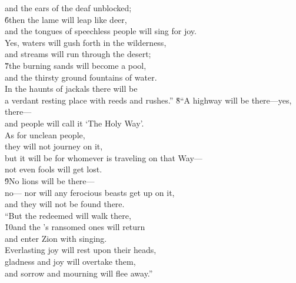 \begin{poetry}
\poemll    and the ears of the deaf unblocked; \\
\poeml \v{6}then the lame will leap like deer, \\
\poemll    and the tongues of speechless people will sing for joy. \\
\poeml Yes, waters will gush forth in the wilderness, \\
\poemll    and streams will run through the desert; \\
\poeml \v{7}the burning sands will become a pool, \\
\poemll    and the thirsty ground fountains of water. \\
\poeml In the haunts of jackals there will be \\
\poemll    a verdant resting place with reeds and rushes.''
\poeml \v{8}``A highway will be there---yes, there--- \\
\poemll    and people will call it `The Holy Way'. \\
\poeml As for unclean people, \\
\poemll    they will not journey on it, \\
\poeml but it will be for whomever is traveling on that Way--- \\
\poemlll       not even fools will get lost. \\
\poeml \v{9}No lions will be there--- \\
\poemll    no--- nor will any ferocious beasts get up on it, \\
\poemlll       and they will not be found there. \\
\poeml ``But the redeemed will walk there, \\
\poeml \v{10}and the 's ransomed ones will return \\
\poemlll       and enter Zion with singing. \\
\poeml Everlasting joy will rest upon their heads, \\
\poemll    gladness and joy will overtake them, \\
\poemlll       and sorrow and mourning will flee away.''
\end{poetry}

